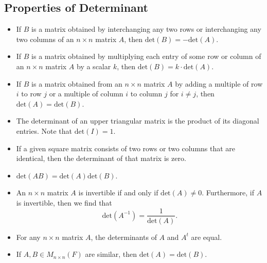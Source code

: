 \subsection{Properties of Determinant}
\begin{itemize}
    \item If \( B  \) is a matrix obtained by interchanging any two rows or interchanging any two columns of an \( n \times n  \) matrix \( A  \), then \( \text{det}(B) = - \text{det}(A) \).
    \item If \( B  \) is a matrix obtained by multiplying each entry of some row or column of an \( n \times n  \) matrix \( A  \) by a scalar \( k \), then \( \text{det}(B) = k \cdot \text{det}(A) \).
    \item If \( B  \) is a matrix obtained from an \( n \times n  \) matrix \( A  \) by adding a multiple of row \( i  \) to row \( j  \) or a multiple of column \( i  \) to column \( j  \) for \( i \neq j  \), then \( \text{det}(A) = \text{det}(B) \).
    \item The determinant of an upper triangular matrix is the product of its diagonal entries. Note that \( \text{det}(I) = 1  \).
    \item If a given square matrix consists of two rows or two columns that are identical, then the determinant of that matrix is zero.
    \item \( \text{det}(AB) = \text{det}(A) \text{det}(B) \).
    \item An \( n \times n   \) matrix \( A  \) is invertible if and only if \( \text{det}(A) \neq 0  \). Furthermore, if \( A  \) is invertible, then we find that 
        \[  \text{det}(A^{-1}) = \frac{ 1 }{ \text{det}(A) }. \]
    \item For any \( n \times n \) matrix \( A  \), the determinants of \( A  \) and \( A^{t} \) are equal.
    \item If \( A,B \in {M}_{n \times n}(F) \) are similar, then \( \text{det}(A) = \text{det}(B) \).
 \end{itemize}

